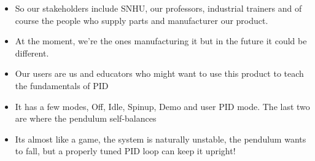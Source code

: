 \documentclass[aspectratio=169]{beamer}
\begin{document}
\begin{frame}
{\begin{itemize}
 \item So our stakeholders include SNHU, our professors, industrial trainers and of course the people who supply parts and manufacturer our product.
 \item At the moment, we're the ones manufacturing it but in the future it could be different.
 \item Our users are us and educators who might want to use this product to teach the fundamentals of PID
 \item It has a few modes, Off, Idle, Spinup, Demo and user PID mode. The last two are where the pendulum self-balances
 \item Its almost like a game, the system is naturally unstable, the pendulum wants to fall, but a properly tuned PID loop can keep it upright!
\end{itemize}
}

\end{frame}
\end{document}
